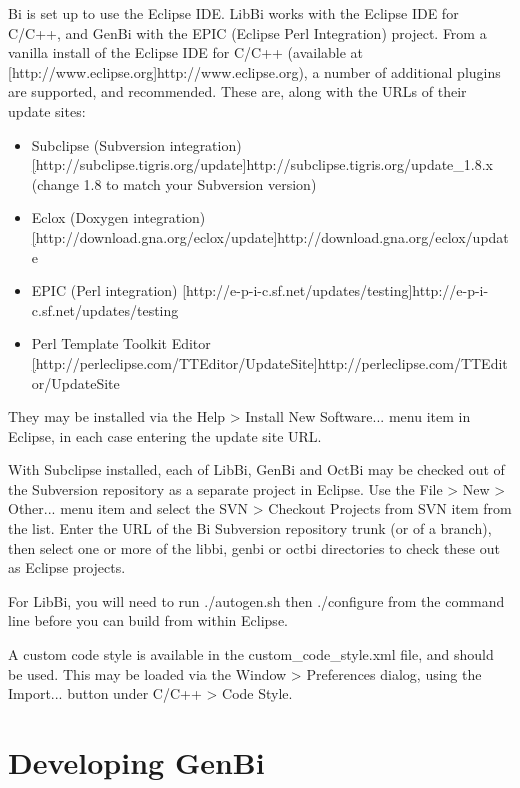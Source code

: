 Bi is set up to use the Eclipse IDE. LibBi works with the Eclipse IDE for
C/C++, and GenBi with the EPIC (Eclipse Perl Integration) project. From a
vanilla install of the Eclipse IDE for C/C++ (available at
\hyperref[hyper][http://www.eclipse.org]{http://www.eclipse.org}), a number of
additional plugins are supported, and recommended. These are, along with the
URLs of their update sites:
\begin{itemize}
\item Subclipse (Subversion integration)
  \hyperref[hyper][http://subclipse.tigris.org/update]{http://subclipse.tigris.org/update\_1.8.x}
  (change 1.8 to match your Subversion version)

\item Eclox (Doxygen integration) \hyperref[hyper][http://download.gna.org/eclox/update]{http://download.gna.org/eclox/update}

\item EPIC (Perl integration) \hyperref[hyper][http://e-p-i-c.sf.net/updates/testing]{http://e-p-i-c.sf.net/updates/testing}

\item Perl Template Toolkit Editor \hyperref[hyper][http://perleclipse.com/TTEditor/UpdateSite]{http://perleclipse.com/TTEditor/UpdateSite}
\end{itemize}
They may be installed via the \textsf{Help > Install New Software...} menu
item in Eclipse, in each case entering the update site URL.

With Subclipse installed, each of LibBi, GenBi and OctBi may be checked out of
the Subversion repository as a separate project in Eclipse. Use the
\textsf{File > New > Other...} menu item and select the \textsf{SVN > Checkout
  Projects from SVN} item from the list. Enter the URL of the Bi Subversion
repository trunk (or of a branch), then select one or more of the
\textsf{libbi}, \textsf{genbi} or \textsf{octbi} directories to check these
out as Eclipse projects.

For LibBi, you will need to run \textsf{./autogen.sh} then
\textsf{./configure} from the command line before you can build from within
Eclipse.

A custom code style is available in the \textsf{custom\_code\_style.xml} file,
and should be used. This may be loaded via the \textsf{Window > Preferences}
dialog, using the \textsf{Import...} button under \textsf{C/C++ > Code Style}.


\section{Developing GenBi}

